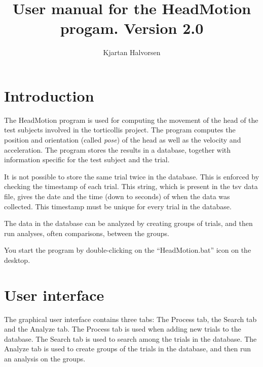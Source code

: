 \documentclass[a4paper,11pt]{article}
\title{User manual for the HeadMotion progam. Version 2.0}
\author{Kjartan Halvorsen}
\begin{document}
\maketitle

\section{Introduction}
The HeadMotion program is used for computing the movement of the head of the
test subjects involved in the torticollis project. 
The program
computes the position and orientation (called \emph{pose}) of the head
as well as the velocity and acceleration. The program stores the
results in a database, together with information specific for the test
subject and the trial.

It is not possible to store the same trial twice in the database. This
is enforced by checking the timestamp of each trial. This string,
which is present in the tsv data file, gives the date and the time
(down to seconds) of when the data was collected. This timestamp must
be unique for every trial in the database. 

The data in the database can be analyzed by creating groups of trials,
and then run analyses, often comparisons, between the groups.

You start the program by double-clicking on the ``HeadMotion.bat''
icon on the desktop.

\section{User interface}
The graphical user interface contains three tabs: The Process tab, the
Search tab and the Analyze tab. The Process tab is used when adding
new trials to the database. The Search tab is used to search among the
trials in the database. The Analyze tab is used to create groups of
the trials in the database, and then run an analysis on the groups.
\end{document}
